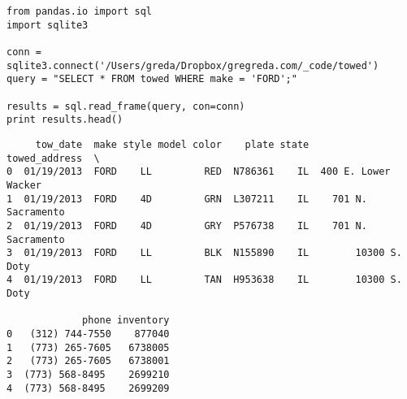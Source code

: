 \begin{framed}
\begin{verbatim}
from pandas.io import sql
import sqlite3

conn = sqlite3.connect('/Users/greda/Dropbox/gregreda.com/_code/towed')
query = "SELECT * FROM towed WHERE make = 'FORD';"

results = sql.read_frame(query, con=conn)
print results.head()
\end{verbatim}
\end{framed}
\begin{verbatim}
     tow_date  make style model color    plate state        towed_address  \
0  01/19/2013  FORD    LL         RED  N786361    IL  400 E. Lower Wacker   
1  01/19/2013  FORD    4D         GRN  L307211    IL    701 N. Sacramento   
2  01/19/2013  FORD    4D         GRY  P576738    IL    701 N. Sacramento   
3  01/19/2013  FORD    LL         BLK  N155890    IL        10300 S. Doty   
4  01/19/2013  FORD    LL         TAN  H953638    IL        10300 S. Doty   

             phone inventory  
0   (312) 744-7550    877040  
1   (773) 265-7605   6738005  
2   (773) 265-7605   6738001  
3  (773) 568-8495    2699210  
4  (773) 568-8495    2699209  

\end{verbatim}



